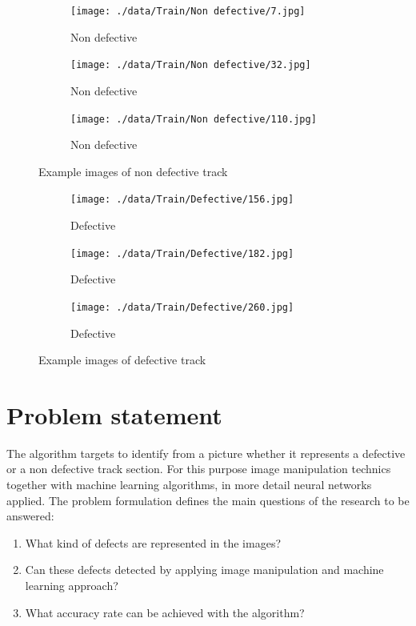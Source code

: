 \documentclass[10pt, final]{article}
\begin{document}
\begin{figure}[!ht]
	\centering
	\begin{subfigure}{0.3\textwidth}
		\centering
		\texttt{[image: ./data/Train/Non defective/7.jpg]}
		\caption{Non defective}
	\end{subfigure}
	\begin{subfigure}{0.3\textwidth}
		\centering
		\texttt{[image: ./data/Train/Non defective/32.jpg]}
		\caption{Non defective}
	\end{subfigure}
	\begin{subfigure}{0.3\textwidth}
		\centering
		\texttt{[image: ./data/Train/Non defective/110.jpg]}
		\caption{Non defective}
	\end{subfigure}
	\caption{Example images of non defective track}
	\label{fig:track_non_def}
\end{figure}

\begin{figure}[!ht]
	\centering
	\begin{subfigure}{0.3\textwidth}
		\centering
		\texttt{[image: ./data/Train/Defective/156.jpg]}
		\caption{Defective}
	\end{subfigure}
	\begin{subfigure}{0.3\textwidth}
		\centering
		\texttt{[image: ./data/Train/Defective/182.jpg]}
		\caption{Defective}
	\end{subfigure}
	\begin{subfigure}{0.3\textwidth}
		\centering
		\texttt{[image: ./data/Train/Defective/260.jpg]}
		\caption{Defective}
	\end{subfigure}
	\caption{Example images of defective track}
	\label{fig:track_def}
\end{figure}

\section{Problem statement} \label{sec:prob_stat}
The algorithm targets to identify from a picture whether it represents a defective or a non defective
track section.
For this purpose image manipulation technics together with machine learning algorithms, in more detail
neural networks applied.
The problem formulation defines the main questions of the research to be answered:

\begin{enumerate}[label=Q\arabic*]
	\item \label{itm:Q1} What kind of defects are represented in the images?
	\item \label{itm:Q2} Can these defects detected by applying image manipulation
	      and machine learning approach?
	\item \label{itm:Q3} What accuracy rate can be achieved with the algorithm?
\end{enumerate}
\end{document}
